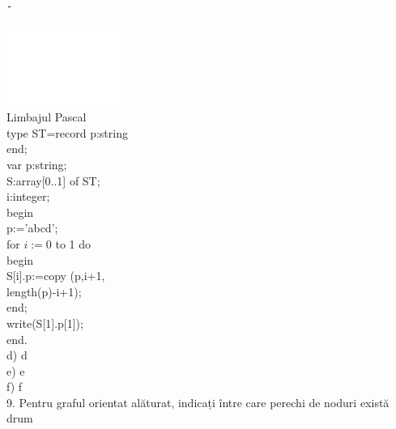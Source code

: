 \documentclass[10pt]{article}
\begin{document}
\begin{verbatim}
-
\end{verbatim}

\includegraphics[max width=\textwidth, center]{2025_04_17_46e04c6acd873ea9558dg-231}\\
Limbajul Pascal\\
type ST=record p:string\\
end;\\
var p:string;\\[0pt]
S:array[0..1] of ST;\\
i:integer;\\
begin\\
p:='abcd';\\
for $i:=0$ to 1 do\\
begin\\[0pt]
S[i].p:=copy (p,i+1,\\
length(p)-i+1);\\
end;\\[0pt]
write(S[1].p[1]);\\
end.\\
d) d\\
e) e\\
f) f\\
9. Pentru graful orientat alăturat, indicați între care perechi de noduri există drum\\
\end{document}
